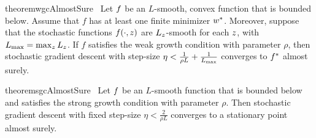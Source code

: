 \begin{restatable}{theorem}{wgcAlmostSure}~\label{theorem:wgc-almost-sure}
    Let \( f \) be an \( L \)-smooth, convex function that is bounded below.
    Assume that \( f \) has at least one finite minimizer \( w^* \).
    Moreover, suppose that the stochastic functions \( f(\cdot, z) \) are \( L_z \)-smooth for each \( z \), with \( L_{\text{max}} = \max_z L_z \).
    If \( f \) satisfies the weak growth condition with parameter \( \rho \), then stochastic gradient descent with step-size \( \eta < \frac{1}{\rho L} + \frac{1}{L_{\text{max}}} \) converges to \( f^* \) almost surely.
\end{restatable}


\begin{restatable}{theorem}{sgcAlmostSure}~\label{theorem:sgc-almost-sure}
    Let \( f \) be an \( L \)-smooth function that is bounded below and satisfies the strong growth condition with parameter \(\rho \).
    Then stochastic gradient descent with fixed step-size \(\eta < \frac{2}{\rho L} \) converges to a stationary point almost surely.
\end{restatable}

\endinput
